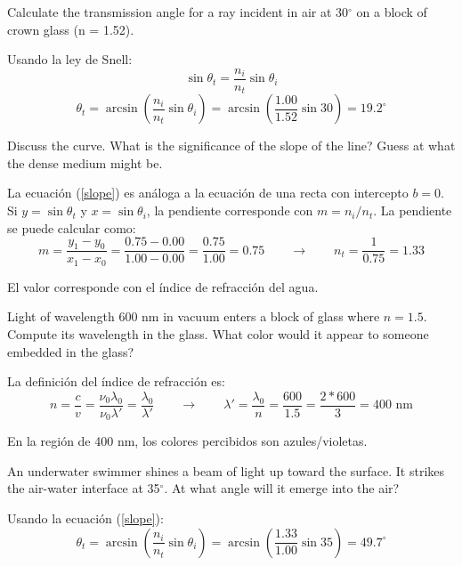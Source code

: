 \documentclass[addpoints,10pt]{exam}
\begin{document}
\begin{questions}
		{
			\question
			Calculate the transmission angle for a ray incident in air at 30$^\circ$ on a block of crown glass (n = 1.52).
		}
		
		Usando la ley de Snell:
		\begin{equation}\label{slope}
			\sin\theta_t = \dfrac{n_i}{n_t}\sin\theta_i
		\end{equation}
		\begin{equation}
			\theta_t = \arcsin\left(\dfrac{n_i}{n_t}\sin\theta_i\right) = \arcsin\left(\dfrac{1.00}{1.52}\sin30\right) = 19.2 ^\circ
		\end{equation}
		
		{
			\question
			Discuss the curve.
			What is the significance of the slope of the line? Guess at what the dense medium might be.
		}
		
		La ecuaci\'on (\ref{slope}) es an\'aloga a la ecuaci\'on de una recta con intercepto $b = 0$. Si $y = \sin \theta_t$ y $x = \sin \theta_i$, la pendiente corresponde con $m = n_i/n_t$. La pendiente se puede calcular como:
		\begin{equation}
			m = \dfrac{y_1 - y_0}{x_1 - x_0} = \dfrac{0.75 - 0.00}{1.00 - 0.00} = \dfrac{0.75}{1.00} = 0.75 \qquad \longrightarrow \qquad n_t = \dfrac{1}{0.75} = 1.33
		\end{equation}
		
		El valor corresponde con el \'indice de refracci\'on del agua.
		
		{
			\question
			Light of wavelength 600 nm in vacuum enters a block of glass where $n = 1.5$. Compute its wavelength in the glass. What color would it appear to someone embedded in the glass?
		}
		
		La definici\'on del \'indice de refracci\'on es:
		\begin{equation}
			n = \dfrac{c}{v} = \dfrac{\nu_0\lambda_0}{\nu_0\lambda'} = \dfrac{\lambda_0}{\lambda'} \qquad \longrightarrow \qquad \lambda' = \dfrac{\lambda_0}{n} = \dfrac{600}{1.5} = \dfrac{2 * 600}{3} = 400 \text{ nm}
		\end{equation}
		
		En la regi\'on de 400 nm, los colores percibidos son azules/violetas.
		
		{
			\question
			An underwater swimmer shines a beam of light up toward the
			surface. It strikes the air-water interface at 35$^\circ$. At what angle will it	emerge into the air?
		}
		
		Usando la ecuaci\'on (\ref{slope}):
		\begin{equation}
			\theta_t = \arcsin\left(\dfrac{n_i}{n_t}\sin\theta_i\right) = \arcsin\left(\dfrac{1.33}{1.00}\sin35\right) = 49.7 ^\circ
		\end{equation}
		

\end{questions}
\end{document}
